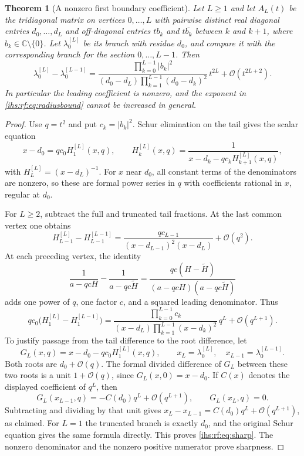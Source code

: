 \documentclass[11pt,a4paper]{article}
\numberwithin{equation}{section}
\newtheorem{theorem}{Theorem}[section]
\theoremstyle{definition}
\theoremstyle{remark}
\newcommand{\C}{\mathbb C}
\newcommand{\bigo}{\mathcal O}
\newcommand{\abs}[1]{\lvert#1\rvert}
\begin{document}
\begin{theorem}[A nonzero first boundary coefficient]\label{ihs:rf:thm:sharp}
Let $L\ge1$ and let $A_L(t)$ be the tridiagonal matrix on vertices
$0,\ldots,L$ with
pairwise distinct real diagonal entries $d_0,\ldots,d_L$ and off-diagonal
entries $t b_k$ and $t\overline{b_k}$ between $k$ and $k+1$, where
$b_k\in\C\setminus\{0\}$. Let $\lambda_0^{[L]}$ be its branch with residue
$d_0$, and compare it with the corresponding branch for the section
$0,\ldots,L-1$. Then
\begin{equation}\label{ihs:rf:eq:sharp}
 \lambda_0^{[L]}-\lambda_0^{[L-1]}
 =\frac{\prod_{k=0}^{L-1}\abs{b_k}^2}
 {(d_0-d_L)\prod_{k=1}^{L-1}(d_0-d_k)^2}\,t^{2L}
 +\bigo(t^{2L+2}).
\end{equation}
In particular the leading coefficient is nonzero, and the exponent in
\eqref{ihs:rf:eq:radiusbound} cannot be increased in general.
\end{theorem}
\begin{proof}
Use $q=t^2$ and put $c_k=\abs{b_k}^2$. Schur elimination on the tail gives
the scalar equation
\begin{equation}\label{ihs:rf:eq:continued}
 x-d_0=q c_0 H_1^{[L]}(x,q),\qquad
 H_k^{[L]}(x,q)=\frac{1}{x-d_k-q c_k H_{k+1}^{[L]}(x,q)},
\end{equation}
with $H_L^{[L]}=(x-d_L)^{-1}$. For $x$ near $d_0$, all constant terms of the
denominators are nonzero, so these are formal power series in $q$ with
coefficients rational in $x$, regular at $d_0$.

For $L\ge2$, subtract the full and truncated tail fractions. At the last
common vertex one obtains
\[
 H_{L-1}^{[L]}-H_{L-1}^{[L-1]}
 =\frac{q c_{L-1}}{(x-d_{L-1})^2(x-d_L)}+\bigo(q^2).
\]
At each preceding vertex, the identity
\[
 \frac1{a-qcH}-\frac1{a-qc\widetilde H}
 =\frac{qc(H-\widetilde H)}{(a-qcH)(a-qc\widetilde H)}
\]
adds one power of $q$, one factor $c$, and a squared leading denominator.
Thus
\[
 q c_0\bigl(H_1^{[L]}-H_1^{[L-1]}\bigr)
 =\frac{\prod_{k=0}^{L-1}c_k}
 {(x-d_L)\prod_{k=1}^{L-1}(x-d_k)^2}\,q^L+\bigo(q^{L+1}).
\]
To justify passage from the tail difference to the root difference, let
\[
 G_L(x,q)=x-d_0-qc_0H_1^{[L]}(x,q),\qquad
 x_L=\lambda_0^{[L]},\quad x_{L-1}=\lambda_0^{[L-1]}.
\]
Both roots are $d_0+\bigo(q)$. The formal divided difference of $G_L$
between these two roots is a unit $1+\bigo(q)$, since
$G_L(x,0)=x-d_0$. If $C(x)$ denotes the displayed coefficient of $q^L$,
then
\[
 G_L(x_{L-1},q)=-C(d_0)q^L+\bigo(q^{L+1}),\qquad
 G_L(x_L,q)=0.
\]
Subtracting and dividing by that unit gives
$x_L-x_{L-1}=C(d_0)q^L+\bigo(q^{L+1})$, as claimed.
For $L=1$ the truncated branch is exactly $d_0$, and the original Schur
equation gives the same formula directly. This proves \eqref{ihs:rf:eq:sharp}. The nonzero
denominator and the nonzero positive numerator prove sharpness.
\end{proof}
\end{document}
